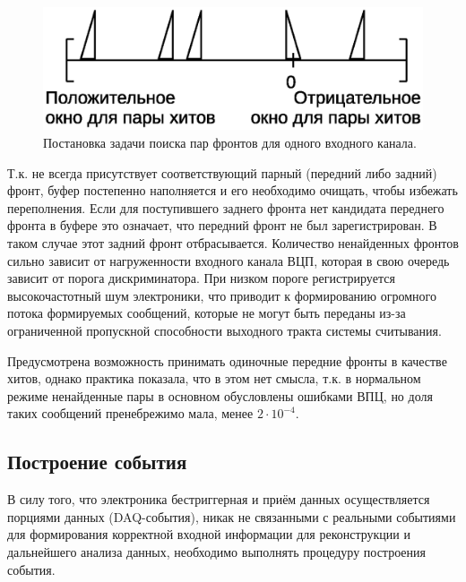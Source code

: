\begin{figure}
\includegraphics[width=1.0\textwidth]{pictures/14_Edge_matching_rus.eps}
\caption{Постановка задачи поиска пар фронтов для одного входного канала.}
\label{fig:EdgeMatching}
\end{figure}

Т.к. не всегда присутствует соответствующий парный (передний либо задний) фронт, буфер постепенно наполняется и его необходимо очищать, чтобы избежать переполнения. Если для поступившего заднего фронта нет кандидата переднего фронта в буфере это означает, что передний фронт не был зарегистрирован. В таком случае этот задний фронт отбрасывается. Количество ненайденных фронтов сильно зависит от нагруженности входного канала ВЦП, которая в свою очередь зависит от порога дискриминатора. При низком пороге регистрируется высокочастотный шум электроники, что приводит к формированию огромного потока формируемых сообщений, которые не могут быть переданы из-за ограниченной пропускной способности выходного тракта системы считывания.

Предусмотрена возможность принимать одиночные передние фронты в качестве хитов, однако практика показала, что в этом нет смысла, т.к. в нормальном режиме ненайденные пары в основном обусловлены ошибками ВПЦ, но доля таких сообщений пренебрежимо мала, менее $ 2 \cdot 10^{-4} $.

\subsection{Построение события}

В силу того, что электроника бестриггерная и приём данных осуществляется порциями данных (DAQ-события), никак не связанными с реальными событиями для формирования корректной входной информации для реконструкции и дальнейшего анализа данных, необходимо выполнять процедуру построения события.

